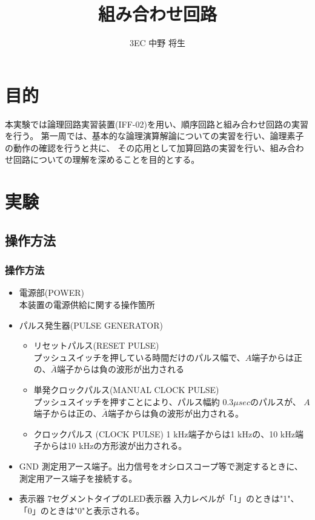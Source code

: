 \documentclass[dvipdfmx]{jsarticle}
\begin{document}
	\title{組み合わせ回路}
	\author{3EC 中野 将生}
	\maketitle
	\section{目的}
		本実験では論理回路実習装置(IFF-02)を用い、順序回路と組み合わせ回路の実習を行う。
		第一周では、基本的な論理演算解論についての実習を行い、論理素子の動作の確認を行うと共に、
		その応用として加算回路の実習を行い、組み合わせ回路についての理解を深めることを目的とする。
	\section{実験}
		\subsection{操作方法}
			\subsubsection{操作方法}
				\begin{itemize}
					\item 電源部(POWER) \\
						本装置の電源供給に関する操作箇所
					\item パルス発生器(PULSE GENERATOR)
						\begin{itemize}
							\item リセットパルス(RESET PULSE) \\
								プッシュスイッチを押している時間だけのパルス幅で、$A$端子からは正の、$\bar{A}$端子からは負の波形が出力される
							\item 単発クロックパルス(MANUAL CLOCK PULSE) \\
								プッシュスイッチを押すことにより、パルス幅約 $0.3 \mu sec$のパルスが、
								$A$端子からは正の、$\bar{A}$端子からは負の波形が出力される。
							\item クロックパルス (CLOCK PULSE)
								1 kHz端子からは1 kHzの、10 kHz端子からは10 kHzの方形波が出力される。
						\end{itemize}
					\item GND
						測定用アース端子。出力信号をオシロスコープ等で測定するときに、測定用アース端子を接続する。
					\item 表示器
						7セグメントタイプのLED表示器
						入力レベルが「1」のときは"1"、「0」のときは"0"と表示される。
				\end{itemize}
\end{document}
